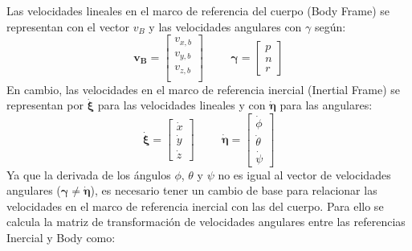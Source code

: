 \documentclass[twoside,11pt]{book}
\begin{document}
Las velocidades lineales en el marco de referencia del cuerpo (Body Frame) se representan con el vector $v_B$ y las velocidades angulares con $\gamma$ según:
\begin{equation}
\pmb{v_B}=\left[\begin{array}{c}
v_{x,b}\\
v_{y,b}\\
v_{z,b}\\
\end{array}\right] \hspace{1cm} \pmb{\gamma}=\left[\begin{array}{c}
p\\
n\\
r
\end{array} \right]
\end{equation}
En cambio, las velocidades en el marco de referencia inercial (Inertial Frame)  se representan por $\pmb{\dot{\xi}}$ para las velocidades lineales y con $\pmb{\dot{\eta}}$ para las angulares: 
\begin{equation}
\pmb{\dot{\xi}}=\left[\begin{array}{c}
\dot{x} \\
\dot{y} \\
\dot{z}
\end{array} \right] \hspace{1cm} \pmb{\dot{\eta}}=\left[\begin{array}{c}
\dot{\phi} \\
\dot{\theta} \\
\dot{\psi}
\end{array} \right] 
\end{equation}
Ya que la derivada de los ángulos $\phi$, $\theta$ y $\psi$ no es igual al vector de velocidades angulares ($\pmb{\gamma} \neq \pmb{\dot{\eta}}$), es necesario tener un cambio de base para relacionar las velocidades en el marco de referencia inercial con las del cuerpo. Para ello se calcula la matriz de transformación de velocidades angulares entre las referencias Inercial y Body como:
\end{document}

